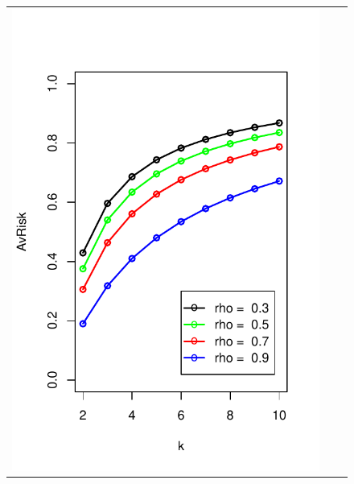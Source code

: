 \documentclass[12pt]{article}
\begin{document}
\begin{figure}[h]
\centering
\begin{tabular}{ccc}
\includegraphics[scale = 0.45, clip = true, trim = 0.05in 0 0.2in 0.6in]{illus_rhos_avrisk.pdf} &

\end{tabular}
\end{figure}
\end{document}
